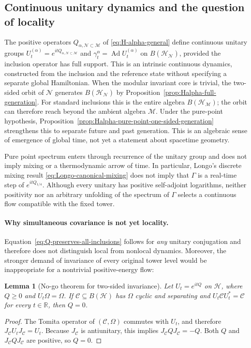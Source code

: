 \documentclass[a4paper,11pt]{article}
\newtheorem{lemma}[theorem]{Lemma}
\theoremstyle{definition}
\newcommand{\mN}{\mathcal{N}}
\newcommand{\mH}{\mathcal{H}}
\newcommand{\mM}{\mathcal{M}}
\begin{document}
\subsection{Continuous unitary dynamics and the question of locality}
\label{subsec:emergent-continuous-time}

The positive operators $Q_{\alpha,\mN\subset\mM}$ of
\eqref{eq:H-alpha-general} define continuous unitary groups
$U_t^{(\alpha)}=e^{itQ_{\alpha,\mN\subset\mM}}$ and
$\gamma_t^\alpha=\operatorname{Ad}U_t^{(\alpha)}$ on
$B(\mH_{\mN})$, provided the inclusion operator has full support.
This is an intrinsic continuous dynamics, constructed from the inclusion
and the reference state without specifying a separate global Hamiltonian.
When the modular invariant core is trivial, the two-sided orbit of
$\mN$ generates $B(\mH_{\mN})$ by
Proposition~\ref{prop:Halpha-full-generation}.  For standard inclusions
this is the entire algebra $B(\mH_{\mM})$; the orbit can therefore
reach beyond the ambient algebra $\mM$.  Under the pure-point hypothesis,
Proposition~\ref{prop:Halpha-pure-point-one-sided-generation} strengthens
this to separate future and past generation.  This is an algebraic sense
of emergence of global time, not yet a statement about spacetime geometry.

Pure point spectrum enters through recurrence of the unitary group and
does not imply mixing or a thermodynamic arrow of time. In particular,
Longo's discrete mixing result \eqref{eq:Longo-canonical-mixing} does not
imply that $\Gamma$ is a real-time step of $e^{itQ_{1/4}}$.  Although
every unitary has positive self-adjoint logarithms, neither positivity
nor an arbitrary unfolding of the spectrum of $\Gamma$ selects a
continuous flow compatible with the fixed tower.

\paragraph{Why simultaneous covariance is not yet locality.}
Equation~\eqref{eq:Q-preserves-all-inclusions} follows for
\emph{any} unitary conjugation and therefore does not distinguish
local from nonlocal dynamics. Moreover, the stronger demand of
invariance of every original tower level would be inappropriate
for a nontrivial positive-energy flow:

\begin{lemma}[No-go theorem for two-sided invariance]
\label{lem:Q-fixed-standard-no-go}
Let $U_t=e^{itQ}$ on $\mH$, where $Q\geq0$ and
$U_t\Omega=\Omega$. If $\mathcal C\subseteq B(\mH)$ has
$\Omega$ cyclic and separating and
$U_t\mathcal C U_t^*=\mathcal C$ for every $t\in\mathbb R$,
then $Q=0$.
\end{lemma}
\begin{proof}
The Tomita operator of $(\mathcal C,\Omega)$ commutes with
$U_t$, and therefore $J_{\mathcal C}U_tJ_{\mathcal C}=U_t$.
Because $J_{\mathcal C}$ is antiunitary, this implies
$J_{\mathcal C}QJ_{\mathcal C}=-Q$. Both $Q$ and
$J_{\mathcal C}QJ_{\mathcal C}$ are positive, so $Q=0$.
\end{proof}
\end{document}
